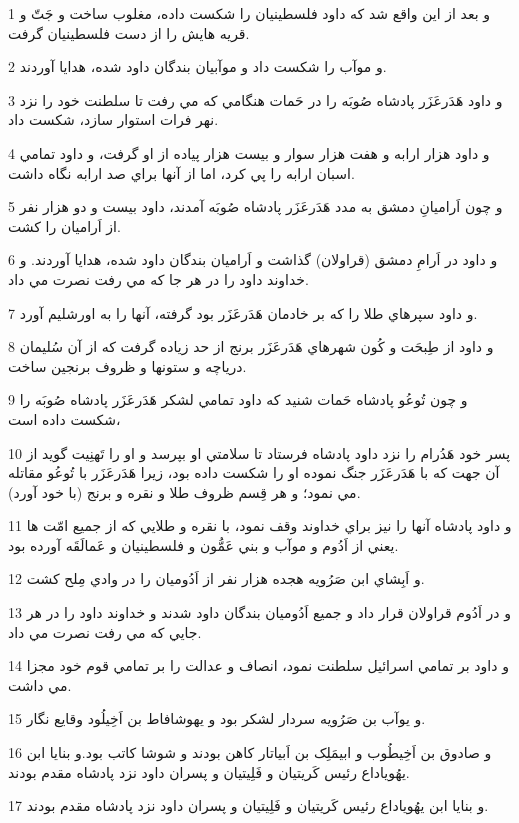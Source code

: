 \par 1 و بعد از اين واقع شد که داود فلسطينيان را شکست داده، مغلوب ساخت و جَتّ و قريه هايش را از دست فلسطينيان گرفت.
\par 2 و موآب را شکست داد و موآبيان بندگان داود شده، هدايا آوردند.
\par 3 و داود هَدَرعَزَر پادشاه صُوبَه را در حَمات هنگامي که مي رفت تا سلطنت خود را نزد نهر فرات استوار سازد، شکست داد.
\par 4 و داود هزار ارابه و هفت هزار سوار و بيست هزار پياده از او گرفت، و داود تمامي اسبان ارابه را پي کرد، اما از آنها براي صد ارابه نگاه داشت.
\par 5 و چون اَراميانِ دمشق به مدد هَدَرعَزَر پادشاه صُوبَه آمدند، داود بيست و دو هزار نفر از اَراميان را کشت.
\par 6 و داود در اَرامِ دمشق (قراولان) گذاشت و اَراميان بندگان داود شده، هدايا آوردند. و خداوند داود را در هر جا که مي رفت نصرت مي داد.
\par 7 و داود سپرهاي طلا را که بر خادمان هَدَرعَزَر بود گرفته، آنها را به اورشليم آورد.
\par 8 و داود از طِبحَت و کُون شهرهاي هَدَرعَزَر برنج از حد زياده گرفت که از آن سُليمان درياچه و ستونها و ظروف برنجين ساخت.
\par 9 و چون تُوعُو پادشاه حَمات شنيد که داود تمامي لشکر هَدَرعَزَر پادشاه صُوبَه را شکست داده است،
\par 10 پسر خود هَدُرام را نزد داود پادشاه فرستاد تا سلامتي او بپرسد و او را تَهنِيت گويد از آن جهت که با هَدَرعَزَر جنگ نموده او را شکست داده بود، زيرا هَدَرعَزَر با تُوعُو مقاتله مي نمود؛ و هر قِسم ظروف طلا و نقره و برنج (با خود آورد).
\par 11 و داود پادشاه آنها را نيز براي خداوند وقف نمود، با نقره و طلايي که از جميع امّت ها يعني از اَدُوم و موآب و بني عَمُّون و فلسطينيان و عَمالَقَه آورده بود.
\par 12 و اَبِشاي ابن صَرُويه هجده هزار نفر از اَدُوميان را در وادي مِلح کشت.
\par 13 و در اَدُوم قراولان قرار داد و جميع اَدُوميان بندگان داود شدند و خداوند داود را در هر جايي که مي رفت نصرت مي داد.
\par 14 و داود بر تمامي اسرائيل سلطنت نمود، انصاف و عدالت را بر تمامي قوم خود مجزا مي داشت.
\par 15 و يوآب بن صَرُويه سردار لشکر بود و يهوشافاط بن اَخِيلُود وقايع نگار.
\par 16 و صادوق بن اَخِيطُوب و ابيمَلِک بن اَبياتار کاهن بودند و شوشا کاتب بود.و بنايا ابن يهُوياداع رئيس کَريتيان و فَلِيتيان و پسران داود نزد پادشاه مقدم بودند.
\par 17 و بنايا ابن يهُوياداع رئيس کَريتيان و فَلِيتيان و پسران داود نزد پادشاه مقدم بودند.
 
